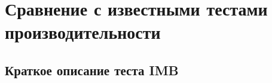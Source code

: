 			
			
			
\section{Сравнение с известными тестами производительности}

\subsection{Краткое описание теста IMB}

